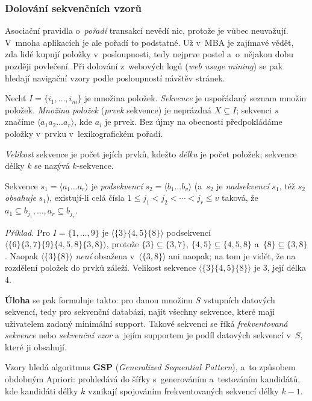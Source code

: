 \documentclass[11pt,a4paper]{article}
\theoremstyle{definition}
\begin{document}
\subsubsection{Dolování sekvenčních vzorů}

Asociační pravidla o~\emph{pořadí} transakcí nevědí nic, protože je vůbec neuvažují. V~mnoha
aplikacích je ale pořadí to podstatné. Už v~MBA je zajímavé vědět, zda lidé kupují položky
v~posloupnosti, tedy nejprve postel a~o~nějakou dobu později povlečení. Při dolování
z~webových logů (\emph{web usage mining}) se pak hledají navigační vzory podle posloupností
návštěv stránek.

\begin{defbox}
Nechť $I=\{i_1,\dots,i_m\}$ je množina položek. \emph{Sekvence} je uspořádaný seznam
množin položek. \emph{Množina položek} (\emph{prvek} sekvence) je neprázdná
$X\subseteq I$; sekvenci $s$ značíme $\langle a_1a_2\dots a_r\rangle$, kde $a_i$ je prvek.
Bez újmy na obecnosti předpokládáme položky v~prvku v~lexikografickém pořadí.

\emph{Velikost} sekvence je počet jejích prvků, kdežto \emph{délka} je počet položek;
sekvence délky $k$ se nazývá $k$-sekvence.

Sekvence $s_1=\langle a_1\dots a_r\rangle$ je \emph{podsekvencí} $s_2=\langle b_1\dots
b_v\rangle$ (a~$s_2$ je \emph{nadsekvencí} $s_1$, též $s_2$ \emph{obsahuje} $s_1$),
existují-li celá čísla $1\le j_1<j_2<\cdots<j_r\le v$ taková, že
$a_1\subseteq b_{j_1},\dots,a_r\subseteq b_{j_r}$.
\end{defbox}

\emph{Příklad.} Pro $I=\{1,\dots,9\}$ je $\langle\{3\}\{4,5\}\{8\}\rangle$ podsekvencí
$\langle\{6\}\{3,7\}\{9\}\{4,5,8\}\{3,8\}\rangle$, protože $\{3\}\subseteq\{3,7\}$,
$\{4,5\}\subseteq\{4,5,8\}$ a~$\{8\}\subseteq\{3,8\}$. Naopak
$\langle\{3\}\{8\}\rangle$ \emph{není} obsažena v~$\langle\{3,8\}\rangle$ ani naopak; na tom
je vidět, že na rozdělení položek do prvků záleží. Velikost sekvence
$\langle\{3\}\{4,5\}\{8\}\rangle$ je 3, její délka 4.

\textbf{Úloha} se pak formuluje takto: pro danou množinu $S$ vstupních datových sekvencí,
tedy pro sekvenční databázi, najít všechny sekvence, které mají uživatelem zadaný minimální
support. Takové sekvenci se říká \emph{frekventovaná sekvence} nebo \emph{sekvenční vzor}
a~jejím supportem je podíl datových sekvencí v~$S$, které ji obsahují.

Vzory hledá algoritmus \textbf{GSP} (\emph{Generalized Sequential Pattern}), a~to způsobem
obdobným Apriori: prohledává do šířky s~generováním a~testováním kandidátů, kde kandidáti
délky $k$ vznikají spojováním frekventovaných sekvencí délky $k-1$.
\end{document}

